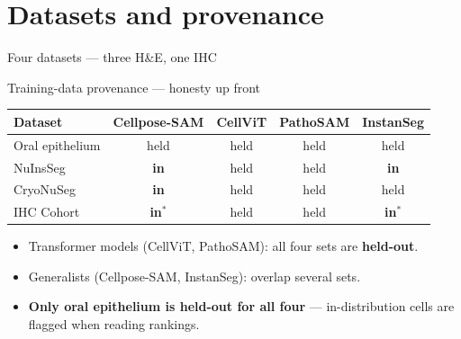 \section{Datasets and provenance}

\begin{frame}{Four datasets --- three H\&E, one IHC}
\end{frame}

\begin{frame}{Training-data provenance --- honesty up front}
    \small
    \centering
    \renewcommand{\arraystretch}{1.15}
    \begin{tabular}{@{}lcccc@{}}
        \toprule
        \textbf{Dataset} & \textbf{Cellpose-SAM} & \textbf{CellViT} & \textbf{PathoSAM} & \textbf{InstanSeg} \\
        \midrule
        Oral epithelium & held & held & held & held \\
        NuInsSeg        & \textbf{in} & held & held & \textbf{in} \\
        CryoNuSeg       & \textbf{in} & held & held & held \\
        IHC Cohort      & \textbf{in}$^{*}$ & held & held & \textbf{in}$^{*}$ \\
        \bottomrule
    \end{tabular}

    \vspace{0.7em}
    \begin{itemize}
        \item Transformer models (CellViT, PathoSAM): all four sets are \textbf{held-out}.
        \item Generalists (Cellpose-SAM, InstanSeg): overlap several sets.
        \item \textbf{\color{myred}Only oral epithelium is held-out for all four} --- in-distribution cells are flagged when reading rankings.
    \end{itemize}
\end{frame}
